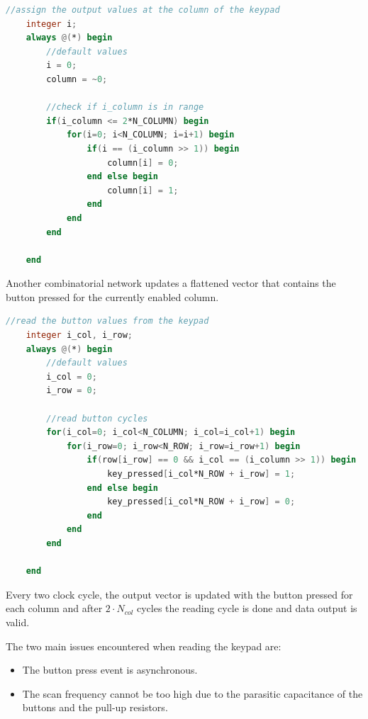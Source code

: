\vspace{0.5cm}
\begin{lstlisting}[language=Verilog, caption=Shift register implementation ]
    //assign the output values at the column of the keypad
    integer i;
    always @(*) begin
        //default values
        i = 0;
        column = ~0;
        
        //check if i_column is in range
        if(i_column <= 2*N_COLUMN) begin
            for(i=0; i<N_COLUMN; i=i+1) begin
                if(i == (i_column >> 1)) begin
                    column[i] = 0;
                end else begin
                    column[i] = 1;
                end
            end
        end
        
    end
\end{lstlisting}
\vspace{0.5cm}

\noindent
Another combinatorial network updates a flattened vector that contains the button pressed for the currently enabled column.

\vspace{0.5cm}
\begin{lstlisting}[language=Verilog, caption=Button reading implementation]
    //read the button values from the keypad
    integer i_col, i_row;
    always @(*) begin
        //default values
        i_col = 0;
        i_row = 0;
        
        //read button cycles
        for(i_col=0; i_col<N_COLUMN; i_col=i_col+1) begin
            for(i_row=0; i_row<N_ROW; i_row=i_row+1) begin
                if(row[i_row] == 0 && i_col == (i_column >> 1)) begin
                    key_pressed[i_col*N_ROW + i_row] = 1; 
                end else begin
                    key_pressed[i_col*N_ROW + i_row] = 0; 
                end
            end
        end
        
    end
\end{lstlisting}
\vspace{0.5cm}

\noindent
Every two clock cycle, the output vector is updated with the button pressed for each column and after \(2 \cdot N_{col}\) cycles the reading cycle is done and data output is valid.

\newpage
\noindent
The two main issues encountered when reading the keypad are:
\begin{itemize}
    \item The button press event is asynchronous.
    \item The scan frequency cannot be too high due to the parasitic capacitance of the buttons and the pull-up resistors.
\end{itemize}

